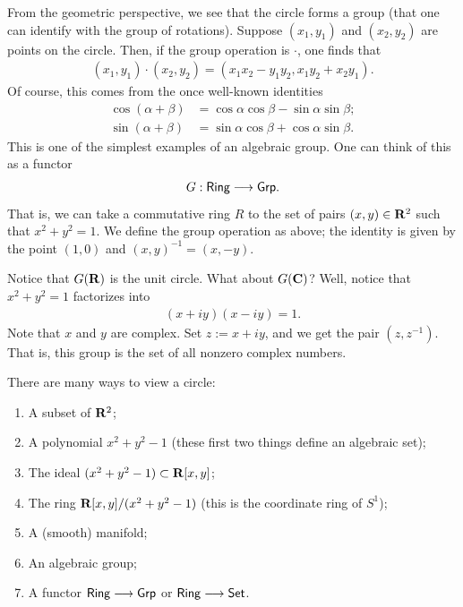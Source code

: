 \documentclass [11 pt, oneside, margin = 1 in] {article}
\begin{document}
From the geometric perspective, we see that the circle forms a group (that one can identify with the group of rotations). Suppose $(x_1,y_1)$ and $(x_2,y_2)$ are points on the circle. Then, if the group operation is $\cdot$, one finds that
\begin{align*}
	(x_1,y_1) \cdot (x_2,y_2) = (x_1x_2-y_1y_2, x_1y_2+x_2y_1).
\end{align*}
Of course, this comes from the once well-known identities
\begin{align*}
	\cos(\alpha+\beta) &=\cos\alpha \cos\beta- \sin \alpha \sin \beta;\\
	\sin(\alpha + \beta) &= \sin\alpha \cos\beta + \cos \alpha \sin \beta.
\end{align*}
This is one of the simplest examples of an algebraic group. One can think of this as a functor
\begin{align*}
	G : \textsf{Ring} \longrightarrow \textsf{Grp}.
\end{align*}
That is, we can take a commutative ring $R$ to the set of pairs $(x,y)\in \mathbf R^2$ such that $x^2+y^2=1$. We define the group operation as above; the identity is given by the point $(1,0)$ and $(x,y) ^{-1} = (x,-y)$.

Notice that $G(\mathbf R)$ is the unit circle. What about $G(\mathbf C)$? Well, notice that $x^2+y^2 =1$ factorizes into
\begin{align*}
	(x+iy) (x-iy) = 1.
\end{align*}
Note that $x$ and $y$ are complex. Set $z := x+iy$, and we get the pair $(z,z^{-1})$. That is, this group is the set of all nonzero complex numbers.

There are many ways to view a circle:
\begin{enumerate}
	\item A subset of $\mathbf R^2$;
	\item A polynomial $x^2 + y^2 -1$ (these first two things define an algebraic set);
	\item The ideal $(x^2+y^2-1)\subset \mathbf R[x,y]$;
	\item The ring $\mathbf R[x,y] / (x^2+y^2-1)$ (this is the coordinate ring of $S^1$);
	\item A (smooth) manifold;
	\item An algebraic group;
	\item A functor $\textsf{Ring}\longrightarrow \textsf{Grp}$ or $\textsf{Ring} \longrightarrow \textsf{Set}$.
\end{enumerate}
\end{document}
